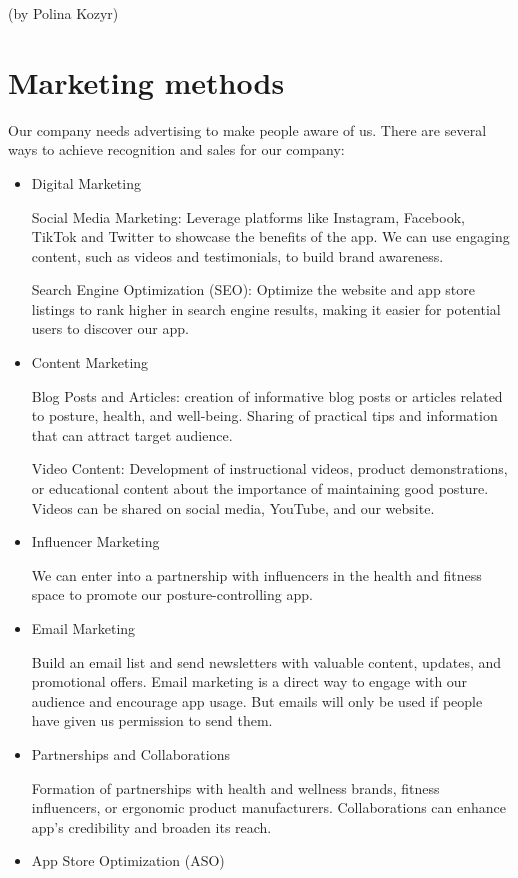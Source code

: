 (by Polina Kozyr)

\section{Marketing methods}

Our company needs advertising to make people aware of us. There are several ways to achieve recognition and sales for our company:

\begin{itemize}
    \item Digital Marketing

    Social Media Marketing: Leverage platforms like Instagram, Facebook, TikTok and Twitter to showcase the benefits of the app. We can use engaging content, such as videos and testimonials, to build brand awareness.
    
    Search Engine Optimization (SEO): Optimize the website and app store listings to rank higher in search engine results, making it easier for potential users to discover our app.
    \item Content Marketing

    Blog Posts and Articles: creation of informative blog posts or articles related to posture, health, and well-being. Sharing of practical tips and information that can attract target audience.
    
    Video Content: Development of instructional videos, product demonstrations, or educational content about the importance of maintaining good posture. Videos can be shared on social media, YouTube, and our website.
    \item Influencer Marketing
    
    We can enter into a partnership with influencers in the health and fitness space to promote our posture-controlling app. 
    \item Email Marketing
    
    Build an email list and send newsletters with valuable content, updates, and promotional offers. Email marketing is a direct way to engage with our audience and encourage app usage. But emails will only be used if people have given us permission to send them.
    \item Partnerships and Collaborations

    Formation of partnerships with health and wellness brands, fitness influencers, or ergonomic product manufacturers. Collaborations can enhance app's credibility and broaden its reach.
    \item App Store Optimization (ASO)
    

\end{itemize}
